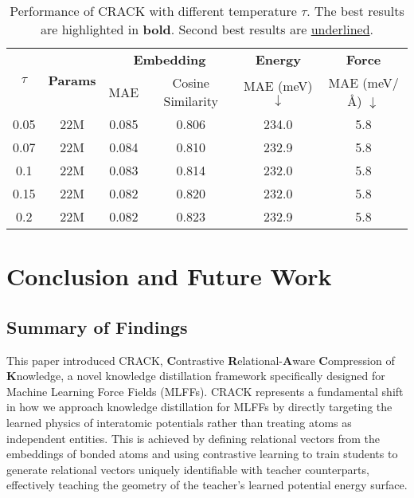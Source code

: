 \documentclass{article}
\begin{document}
\begin{table}[htbp]
\centering
\caption{Performance of CRACK with different temperature $\tau$. The best results are highlighted in \textbf{bold}. Second best results are \underline{underlined}.}
\label{tab:crack-temperature}
\begin{adjustbox}{max width=0.7\textwidth}
\begin{threeparttable}
\begin{tabular}{cccccc}
\toprule
\multirow{2}{*}{\textbf{$\tau$}} & \multirow{2}{*}{\textbf{Params}} & \multicolumn{2}{c}{\textbf{Embedding}} & \textbf{Energy} & \textbf{Force} \\

\cmidrule(lr){3-6}
& & MAE & Cosine Similarity & MAE (meV) $\downarrow$ & MAE (meV/Å) $\downarrow$ \\
\midrule
0.05 & 22M & 0.085 & 0.806 & 234.0 & 5.8 \\ 
0.07 & 22M & 0.084 & 0.810 & 232.9 & 5.8 \\ 
0.1 & 22M & 0.083 & 0.814 & 232.0 & 5.8 \\ 
0.15 & 22M & 0.082 & 0.820 & 232.0 & 5.8 \\ 
0.2 & 22M & 0.082 & 0.823 & 232.9 & 5.8 \\ 
\bottomrule 
\end{tabular}
\end{threeparttable}
\end{adjustbox}
\end{table}


\section{Conclusion and Future Work}
\subsection{Summary of Findings}

This paper introduced CRACK, \textbf{C}ontrastive \textbf{R}elational-\textbf{A}ware \textbf{C}ompression of \textbf{K}nowledge, a novel knowledge distillation framework specifically designed for Machine Learning Force Fields (MLFFs). 
CRACK represents a fundamental shift in how we approach knowledge distillation for MLFFs by directly targeting the learned physics of interatomic potentials rather than treating atoms as independent entities.
This is achieved by defining relational vectors from the embeddings of bonded atoms and using contrastive learning to train students to generate relational vectors uniquely identifiable with teacher counterparts, effectively teaching the geometry of the teacher's learned potential energy surface.
\end{document}
